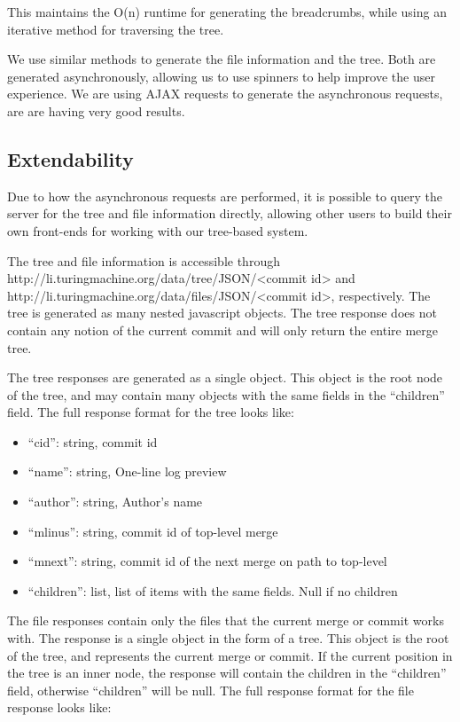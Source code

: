 \documentclass[conference, draftclsnofoot]{IEEEtran}
\begin{document}
This maintains the O(n) runtime for generating the breadcrumbs, while using an
iterative method for traversing the tree.

We use similar methods to generate the file information and the tree. Both are
generated asynchronously, allowing us to use spinners to help improve the user
experience. We are using AJAX requests to generate the asynchronous requests,
are are having very good results.

\subsection{Extendability}
Due to how the asynchronous requests are performed, it is possible to query the
server for the tree and file information directly, allowing other users to
build their own front-ends for working with our tree-based system.

The tree and file information is accessible through
http://li.turingmachine.org/data/tree/JSON/<commit id> and
http://li.turingmachine.org/data/files/JSON/<commit id>, respectively.
The tree is generated as many nested javascript objects. The tree response does
not contain any notion of the current commit and will only return the entire
merge tree.

The tree responses are generated as a single object. This object is the root
node of the tree, and may contain many objects with the same fields in the
``children'' field. The full response format for the tree looks like:

\begin{itemize}
        \item ``cid'': string, commit id
        \item ``name'': string, One-line log preview
        \item ``author'': string, Author's name
        \item ``mlinus'': string, commit id of top-level merge
        \item ``mnext'': string, commit id of the next merge on path to
                top-level
        \item ``children'': list, list of items with the same fields. Null if
                no children
\end{itemize}

The file responses contain only the files that the current merge or commit
works with. The response is a single object in the form of a tree. This object
is the root of the tree, and represents the current merge or commit. If the
current position in the tree is an inner node, the response will contain the
children in the ``children'' field, otherwise ``children'' will be null. The
full response format for the file response looks like:
\end{document}
